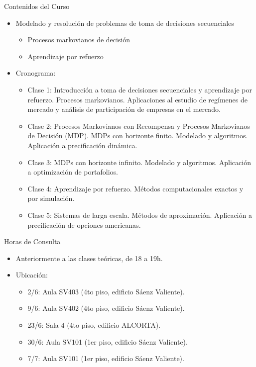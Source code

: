\documentclass{beamer}
\begin{document}
\begin{frame}{Contenidos del Curso}
\begin{itemize}
\item Modelado y resolución de problemas de toma de decisiones secuenciales
\begin{itemize}
\item<2-> Procesos markovianos de decisión
\item<2-> Aprendizaje por refuerzo
\end{itemize}
\item<3-> Cronograma:
\begin{itemize}
\item<4-> Clase 1: Introducción a toma de decisiones secuenciales y aprendizaje por refuerzo. Procesos markovianos. Aplicaciones al estudio de regímenes de mercado y análisis de participación de empresas en el mercado.

\item<5-> Clase 2: Procesos Markovianos con Recompensa y Procesos Markovianos de Decisión (MDP). MDPs con horizonte finito. Modelado y algoritmos. Aplicación a precificación dinámica.

\item<6-> Clase 3: MDPs con horizonte infinito. Modelado y algoritmos. Aplicación a optimización de portafolios.

\item<7-> Clase 4: Aprendizaje por refuerzo. Métodos computacionales exactos y por simulación.

\item<8-> Clase 5: Sistemas de larga escala. Métodos de aproximación. Aplicación a precificación de opciones americanas.
\end{itemize}
\end{itemize}   
\end{frame}

\begin{frame}{Horas de Consulta}
\begin{itemize}
\item Anteriormente a las clases teóricas, de 18 a 19h.
\item Ubicación:
\begin{itemize}
\item 2/6: Aula SV403 (4to piso, edificio Sáenz Valiente).
\item 9/6: Aula SV402 (4to piso, edificio Sáenz Valiente).
\item 23/6: Sala 4 (4to piso, edificio ALCORTA).
\item 30/6: Aula SV101 (1er piso, edificio Sáenz Valiente).
\item 7/7: Aula SV101 (1er piso, edificio Sáenz Valiente).
\end{itemize}
\end{itemize}
\end{frame}
\end{document}
